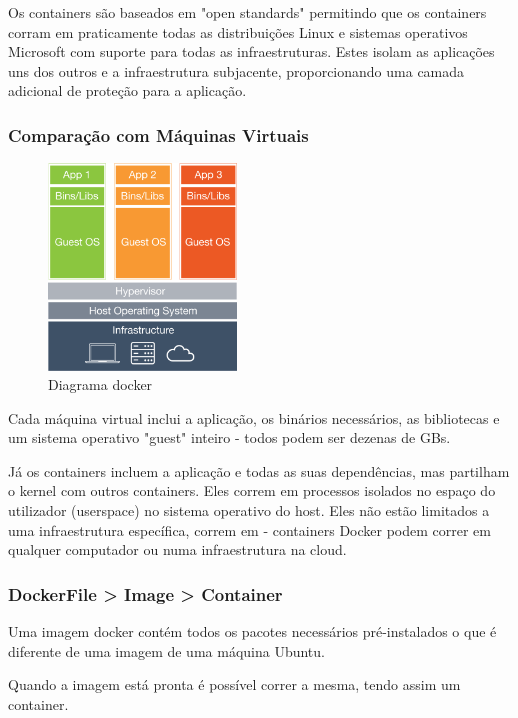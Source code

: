 \documentclass[pdftex,12pt,a4paper]{report}
\begin{document}
Os containers são baseados em "open standards" permitindo que os containers corram em praticamente todas as distribuições Linux e sistemas operativos Microsoft com suporte para todas as infraestruturas. Estes isolam as aplicações uns dos outros e a infraestrutura subjacente, proporcionando uma camada adicional de proteção para a aplicação.

\subsubsection{Comparação com Máquinas Virtuais}

\begin{figure}[!htb]
\center
 \includegraphics[width=50mm,scale=1]{imagens/what-is-docker-diagram.png}
 \caption{Diagrama docker}
 \label{fig:diagram_docker}
\end{figure}

Cada máquina virtual inclui a aplicação, os binários necessários, as bibliotecas e um sistema operativo "guest" inteiro - todos podem ser dezenas de GBs.

Já os containers incluem a aplicação e todas as suas dependências, mas partilham o kernel com outros containers. Eles correm em processos isolados no espaço do utilizador (userspace) no sistema operativo do host. Eles não estão limitados a uma infraestrutura específica, correm em - containers Docker podem correr em qualquer computador ou numa infraestrutura na cloud.

\subsubsection{DockerFile > Image > Container}

Uma imagem docker contém todos os pacotes necessários pré-instalados o que é diferente de uma imagem de uma máquina Ubuntu.

Quando a imagem está pronta é possível correr a mesma, tendo assim um container.
\end{document}

